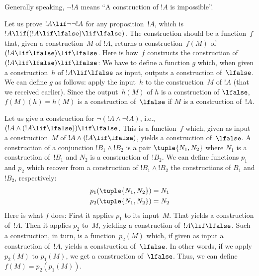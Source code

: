 \documentclass[../../../include/open-logic-section]{subfiles}
\begin{document}
Generally speaking, $\lnot !A$ means ``A construction of $!A$ is impossible''.

\begin{ex}
Let us prove $!A \lif \lnot \lnot !A$ for any proposition~$!A$, which
is $!A \lif ((!A \lif \lfalse) \lif \lfalse)$. The construction should
be a function~$f$ that, given a construction~$M$ of $!A$, returns a
construction~$f(M)$ of $(!A \lif \lfalse) \lif \lfalse$. Here is
how~$f$ constructs the construction of $(!A \lif \lfalse) \lif
\lfalse$: We have to define a function $g$ which, when given a
construction~$h$ of $!A \lif \lfalse$ as input, outputs a construction
of~$\lfalse$. We can define $g$ as follows: apply the input~$h$ to the
construction~$M$ of $!A$ (that we received earlier). Since the
output~$h(M)$ of $h$ is a construction of $\lfalse$, $f(M)(h) = h(M)$ is a
construction of~$\lfalse$ if $M$ is a construction of~$!A$.
\end{ex}

\begin{ex}
Let us give a construction for $\lnot(!A \land \lnot !A)$, i.e., $(!A
\land (!A \lif \lfalse)) \lif \lfalse$. This is a function~$f$ which,
given as input a construction~$M$ of $!A \land (!A \lif \lfalse)$,
yields a construction of~$\lfalse$. A construction of a conjunction
$!B_1 \land !B_2$ is a pair $\tuple{N_1, N_2}$ where $N_1$ is a
construction of~$!B_1$ and $N_2$ is a construction of~$!B_2$. We can
define functions $p_1$ and $p_2$ which recover from a construction of
$!B_1 \land !B_2$ the constructions of $B_1$ and $!B_2$, respectively:
\begin{align*}
  p_1(\tuple{N_1, N_2}) &= N_1\\
  p_2(\tuple{N_1, N_2}) &= N_2
\end{align*}
Here is what $f$ does: First it applies $p_1$ to its input~$M$. That
yields a construction of~$!A$. Then it applies $p_2$ to~$M$, yielding
a construction of~$!A \lif \lfalse$. Such a construction, in turn, is
a function~$p_2(M)$ which, if given as input a construction of~$!A$,
yields a construction of~$\lfalse$. In other words, if we apply
$p_2(M)$ to $p_1(M)$, we get a construction of~$\lfalse$.  Thus, we
can define $f(M) = p_2(p_1(M))$.
\end{ex}
\end{document}
